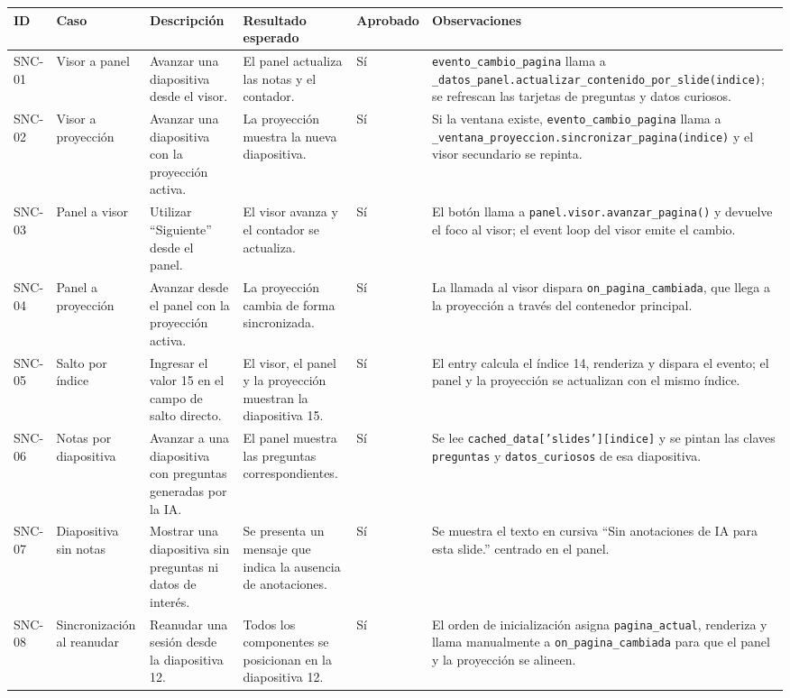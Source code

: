 \documentclass[12pt,letterpaper]{article}
\begin{document}
{\tiny
\renewcommand{\arraystretch}{1.15}
\begin{longtable}{|L{1.1cm}|L{2.3cm}|L{3.2cm}|L{3.6cm}|L{1.2cm}|L{3.6cm}|}
\hline
\textbf{ID} & \textbf{Caso} & \textbf{Descripción} & \textbf{Resultado esperado} & \textbf{Aprobado} & \textbf{Observaciones} \\ \hline
\endhead
SNC-01 & Visor a panel & Avanzar una diapositiva desde el visor. & El panel actualiza las notas y el contador. & Sí & \texttt{evento\_cambio\_pagina} llama a \texttt{\_datos\_panel.actualizar\_contenido\_por\_slide(indice)}; se refrescan las tarjetas de preguntas y datos curiosos. \\ \hline
SNC-02 & Visor a proyección & Avanzar una diapositiva con la proyección activa. & La proyección muestra la nueva diapositiva. & Sí & Si la ventana existe, \texttt{evento\_cambio\_pagina} llama a \texttt{\_ventana\_proyeccion.sincronizar\_pagina(indice)} y el visor secundario se repinta. \\ \hline
SNC-03 & Panel a visor & Utilizar ``Siguiente'' desde el panel. & El visor avanza y el contador se actualiza. & Sí & El botón llama a \texttt{panel.visor.avanzar\_pagina()} y devuelve el foco al visor; el event loop del visor emite el cambio. \\ \hline
SNC-04 & Panel a proyección & Avanzar desde el panel con la proyección activa. & La proyección cambia de forma sincronizada. & Sí & La llamada al visor dispara \texttt{on\_pagina\_cambiada}, que llega a la proyección a través del contenedor principal. \\ \hline
SNC-05 & Salto por índice & Ingresar el valor 15 en el campo de salto directo. & El visor, el panel y la proyección muestran la diapositiva 15. & Sí & El entry calcula el índice 14, renderiza y dispara el evento; el panel y la proyección se actualizan con el mismo índice. \\ \hline
SNC-06 & Notas por diapositiva & Avanzar a una diapositiva con preguntas generadas por la IA. & El panel muestra las preguntas correspondientes. & Sí & Se lee \texttt{cached\_data['slides'][indice]} y se pintan las claves \texttt{preguntas} y \texttt{datos\_curiosos} de esa diapositiva. \\ \hline
SNC-07 & Diapositiva sin notas & Mostrar una diapositiva sin preguntas ni datos de interés. & Se presenta un mensaje que indica la ausencia de anotaciones. & Sí & Se muestra el texto en cursiva ``Sin anotaciones de IA para esta slide.'' centrado en el panel. \\ \hline
SNC-08 & Sincronización al reanudar & Reanudar una sesión desde la diapositiva 12. & Todos los componentes se posicionan en la diapositiva 12. & Sí & El orden de inicialización asigna \texttt{pagina\_actual}, renderiza y llama manualmente a \texttt{on\_pagina\_cambiada} para que el panel y la proyección se alineen. \\ \hline

\end{longtable}}
\end{document}
